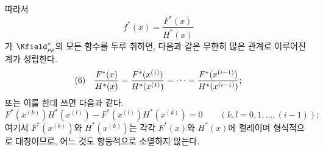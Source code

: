
따라서
\[
f^*(x)=\frac{F^*(x)}{H^*(x)}
\]
가 $\Kfield^*_{\rho\rho}$의 모든 함수를 두루 취하면, 다음과 같은 무한히 많은 관계로 이루어진 계가 성립한다.
\[
\begin{array}{@{}l@{\quad}c@{}}
(6)&\displaystyle \frac{F^*(x)}{H^*(x)}=\frac{F^*(x^{(1)})}{H^*(x^{(1)})}=\cdots=\frac{F^*(x^{(i-1)})}{H^*(x^{(i-1)})};
\end{array}
\]
또는 이를 한데 쓰면 다음과 같다.
\[
F^*(x^{(k)})H^*(x^{(l)})-F^*(x^{(l)})H^*(x^{(k)})=0\qquad(k,l=0,1,\ldots,(i-1));
\]
여기서 $F^*(x^{(k)})$와 $H^*(x^{(k)})$는 각각 $F^*(x)$와 $H^*(x)$에 켤레이며 형식적으로 대칭이므로, 어느 것도 항등적으로 소멸하지 않는다.
